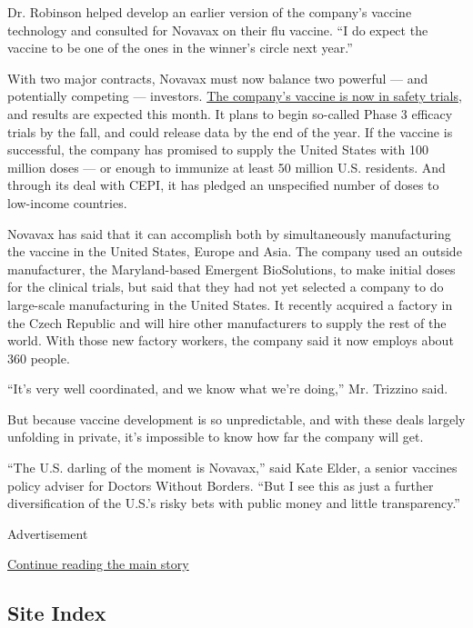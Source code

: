 Dr. Robinson helped develop an earlier version of the company's vaccine
technology and consulted for Novavax on their flu vaccine. ``I do expect
the vaccine to be one of the ones in the winner's circle next year.''

With two major contracts, Novavax must now balance two powerful --- and
potentially competing --- investors.
\href{https://www.nytimes3xbfgragh.onion/interactive/2020/science/coronavirus-vaccine-tracker.html}{The
company's vaccine is now in safety trials}, and results are expected
this month. It plans to begin so-called Phase 3 efficacy trials by the
fall, and could release data by the end of the year. If the vaccine is
successful, the company has promised to supply the United States with
100 million doses --- or enough to immunize at least 50 million U.S.
residents. And through its deal with CEPI, it has pledged an unspecified
number of doses to low-income countries.

Novavax has said that it can accomplish both by simultaneously
manufacturing the vaccine in the United States, Europe and Asia. The
company used an outside manufacturer, the Maryland-based Emergent
BioSolutions, to make initial doses for the clinical trials, but said
that they had not yet selected a company to do large-scale manufacturing
in the United States. It recently acquired a factory in the Czech
Republic and will hire other manufacturers to supply the rest of the
world. With those new factory workers, the company said it now employs
about 360 people.

``It's very well coordinated, and we know what we're doing,'' Mr.
Trizzino said.

But because vaccine development is so unpredictable, and with these
deals largely unfolding in private, it's impossible to know how far the
company will get.

``The U.S. darling of the moment is Novavax,'' said Kate Elder, a senior
vaccines policy adviser for Doctors Without Borders. ``But I see this as
just a further diversification of the U.S.'s risky bets with public
money and little transparency.''

Advertisement

\protect\hyperlink{after-bottom}{Continue reading the main story}

\hypertarget{site-index}{%
\subsection{Site Index}\label{site-index}}

